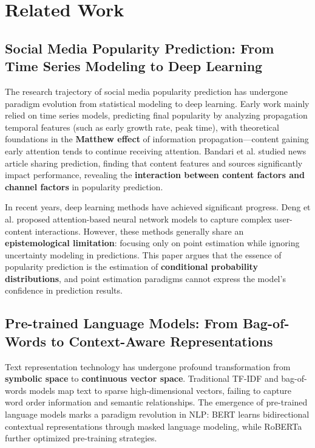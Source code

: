 \documentclass[10pt]{article}
\begin{document}
\section{Related Work}

\subsection{Social Media Popularity Prediction: From Time Series Modeling to Deep Learning}

The research trajectory of social media popularity prediction has undergone paradigm evolution from statistical modeling to deep learning. Early work mainly relied on time series models\cite{yang2011patterns}, predicting final popularity by analyzing propagation temporal features (such as early growth rate, peak time), with theoretical foundations in the \textbf{Matthew effect} of information propagation---content gaining early attention tends to continue receiving attention. Bandari et al.\cite{bandari2012pulse} studied news article sharing prediction, finding that content features and sources significantly impact performance, revealing the \textbf{interaction between content factors and channel factors} in popularity prediction.

In recent years, deep learning methods have achieved significant progress. Deng et al.\cite{deng2020deep} proposed attention-based neural network models to capture complex user-content interactions. However, these methods generally share an \textbf{epistemological limitation}: focusing only on point estimation while ignoring uncertainty modeling in predictions. This paper argues that the essence of popularity prediction is the estimation of \textbf{conditional probability distributions}, and point estimation paradigms cannot express the model's confidence in prediction results.

\subsection{Pre-trained Language Models: From Bag-of-Words to Context-Aware Representations}

Text representation technology has undergone profound transformation from \textbf{symbolic space} to \textbf{continuous vector space}. Traditional TF-IDF and bag-of-words models map text to sparse high-dimensional vectors, failing to capture word order information and semantic relationships. The emergence of pre-trained language models marks a paradigm revolution in NLP: BERT\cite{devlin2019bert} learns bidirectional contextual representations through masked language modeling, while RoBERTa\cite{liu2019roberta} further optimized pre-training strategies.
\end{document}
